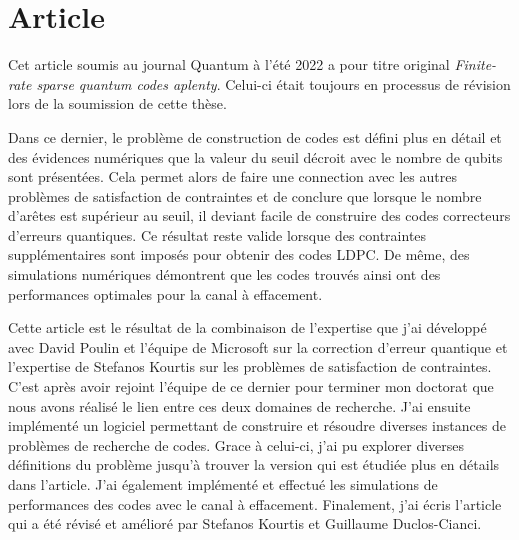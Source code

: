 \section{Article}

Cet article soumis au journal Quantum à l'été 2022 a pour titre original
\textit{Finite-rate sparse quantum codes aplenty}.
Celui-ci était toujours en processus de révision lors de la soumission de cette thèse.

Dans ce dernier, le problème de construction de codes est défini plus en détail
et des évidences numériques que la valeur du seuil décroit avec le nombre de qubits sont présentées.
Cela permet alors de faire une connection avec les autres problèmes de satisfaction de contraintes
et de conclure que lorsque le nombre d'arêtes est supérieur au seuil,
il deviant facile de construire des codes correcteurs d'erreurs quantiques.
Ce résultat reste valide lorsque des contraintes supplémentaires sont imposés pour obtenir
des codes LDPC.
De même,
des simulations numériques démontrent que les codes trouvés ainsi 
ont des performances optimales pour la canal à effacement.

Cette article est le résultat de la combinaison de l'expertise que j'ai développé avec David Poulin
et l'équipe de Microsoft sur la correction d'erreur quantique et l'expertise de Stefanos Kourtis
sur les problèmes de satisfaction de contraintes.
C'est après avoir rejoint l'équipe de ce dernier pour terminer mon doctorat que nous avons 
réalisé le lien entre ces deux domaines de recherche.
J'ai ensuite implémenté un logiciel permettant de construire et résoudre diverses instances 
de problèmes de recherche de codes.
Grace à celui-ci,
j'ai pu explorer diverses définitions du problème jusqu'à trouver la version qui est étudiée plus
en détails dans l'article.
J'ai également implémenté et effectué les simulations de performances des codes avec le canal à effacement.
Finalement, 
j'ai écris l'article qui a été révisé et amélioré par Stefanos Kourtis et Guillaume Duclos-Cianci.


